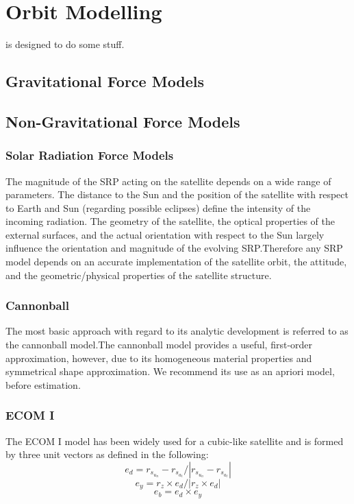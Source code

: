 \chapter{Orbit Modelling}
\label{ch:orbit_modelling}


 is designed to do some stuff.

\section{Gravitational Force Models}

\section{Non-Gravitational Force Models}

\subsection{Solar Radiation Force Models}
The magnitude of the SRP acting on the satellite depends on a wide range of parameters. 
The distance to the Sun and the position of the satellite with respect to Earth and Sun (regarding possible eclipses) define the intensity of the incoming radiation.
The geometry of the satellite, the optical properties of the external surfaces, and the actual orientation with respect to the Sun largely influence the orientation and magnitude of the evolving SRP.Therefore any SRP model depends on an accurate implementation of the satellite orbit, the attitude, and the geometric/physical properties of the satellite structure.
 
\subsection{Cannonball}
\label{sec:cannonball_srp}
The most basic approach with regard to its analytic development is referred to as the cannonball
model.The cannonball model provides a useful, first-order approximation, however, due to its homogeneous material properties and symmetrical shape approximation. We recommend its use as an apriori model, before estimation.

\subsection{ECOM I}
The ECOM I model has been widely used for a cubic-like satellite and is formed by three unit vectors as defined in the following: 
\begin{equation}
e_d = r_s_u_n - r_s_a_t / |r_s_u_n - r_s_a_t|
\end{equation}
\begin{equation}
e_y = r_z \times e_d / |r_z \times e_d|
\end{equation}
\begin{equation}
e_b = e_d \times e_y 
\end{equation}

